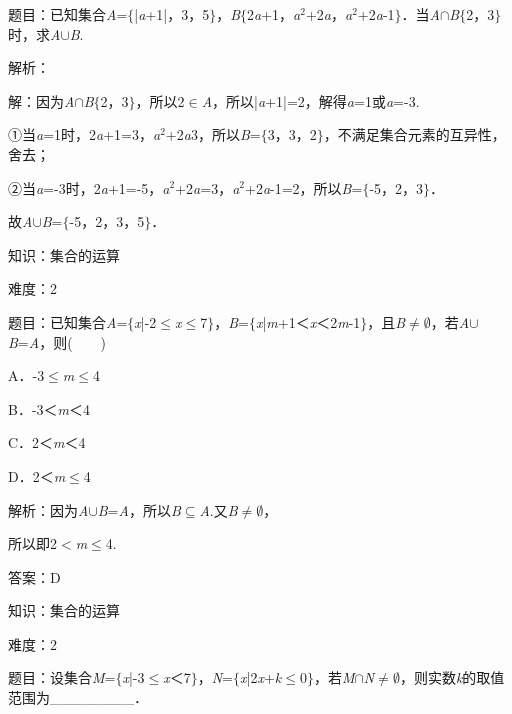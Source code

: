 \documentclass{article} %
\begin{document}
题目：已知集合\textit{A}=$\mathrm{\{}$|\textit{a}+1|，3，5$\mathrm{\}}$，\textit{B}$\mathrm{\{}$2\textit{a}+1，\textit{a}${}^{2}$+2\textit{a}，\textit{a}${}^{2}$+2\textit{a}-1$\mathrm{\}}$．当\textit{A}$\mathrm{\cap}$\textit{B}$\mathrm{\{}$2，3$\mathrm{\}}$时，求\textit{A}$\mathrm{\cup}$\textit{B}.

解析：

解：因为\textit{A}$\mathrm{\cap}$\textit{B}$\mathrm{\{}$2，3$\mathrm{\}}$，所以2$\mathrm{\in}$\textit{A}，所以|\textit{a}+1|=2，解得\textit{a}=1或\textit{a}=-3.

①当\textit{a}=1时，2\textit{a}+1=3，\textit{a}${}^{2}$+2\textit{a}3，所以\textit{B}=$\mathrm{\{}$3，3，2$\mathrm{\}}$，不满足集合元素的互异性，舍去；

②当\textit{a}=-3时，2\textit{a}+1=-5，\textit{a}${}^{2}$+2\textit{a}=3，\textit{a}${}^{2}$+2\textit{a}-1=2，所以\textit{B}=$\mathrm{\{}$-5，2，3$\mathrm{\}}$．

故\textit{A}$\mathrm{\cup}$\textit{B}=$\mathrm{\{}$-5，2，3，5$\mathrm{\}}$．

知识：集合的运算

难度：2

题目：已知集合\textit{A}=$\mathrm{\{}$\textit{x}|-2$\mathrm{\le}$\textit{x}$\mathrm{\le}$7$\mathrm{\}}$，\textit{B}=$\mathrm{\{}$\textit{x}|\textit{m}+1＜\textit{x}＜2\textit{m}-1$\mathrm{\}}$，且\textit{B}$\mathrm{\neq}$$\mathrm{\emptyset}$，若\textit{A}$\mathrm{\cup}$\textit{B}=\textit{A}，则(　　)

A．-3$\mathrm{\le}$\textit{m}$\mathrm{\le}$4  

B．-3＜\textit{m}＜4

C．2＜\textit{m}＜4   

D．2＜\textit{m}$\mathrm{\le}$4

解析：因为\textit{A}$\mathrm{\cup}$\textit{B}=\textit{A}，所以\textit{B}$\mathrm{\subseteq }$\textit{A}.又\textit{B}$\mathrm{\neq}$$\mathrm{\emptyset}$，

所以即2$\mathrm{<}$\textit{m}$\mathrm{\le}$4.

答案：D

知识：集合的运算

难度：2

题目：设集合\textit{M}=$\mathrm{\{}$\textit{x}|-3$\mathrm{\le}$\textit{x}＜7$\mathrm{\}}$，\textit{N}=$\mathrm{\{}$\textit{x}|2\textit{x}+\textit{k}$\mathrm{\le}$0$\mathrm{\}}$，若\textit{M}$\mathrm{\cap}$\textit{N}$\mathrm{\neq}$$\mathrm{\emptyset}$，则实数\textit{k}的取值范围为\_\_\_\_\_\_\_\_．
\end{document}
